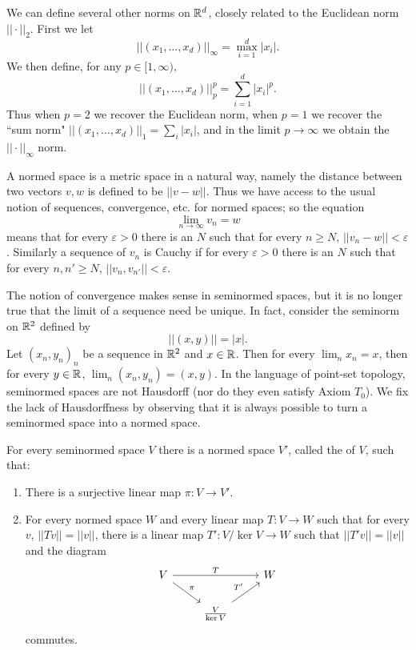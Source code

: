 \begin{example}
We can define several other norms on $\mathbb{R}^d$, closely related to the Euclidean norm $||\cdot||_2$. First we let
$$||(x_1, \dots, x_d)||_\infty = \max_{i=1}^d |x_i|.$$
We then define, for any $p \in [1, \infty),$
$$||(x_1, \dots, x_d)||_p^p = \sum_{i=1}^d |x_i|^p.$$
Thus when $p = 2$ we recover the Euclidean norm, when $p = 1$ we recover the ``sum norm" $||(x_1, \dots, x_d)||_1 = \sum_i |x_i|$, and in the limit $p \to \infty$ we obtain the $||\cdot||_\infty$ norm.
\end{example}

\begin{subsec}
A normed space is a metric space in a natural way, namely the distance between two vectors $v,w$ is defined to be $||v - w||$.
Thus we have access to the usual notion of sequences, convergence, etc. for normed spaces; so the equation
$$\lim_{n \to \infty} v_n = w$$
means that for every $\varepsilon > 0$ there is an $N$ such that for every $n \geq N$, $||v_n - w|| < \varepsilon$.
Similarly a sequence of $v_n$ is Cauchy if for every $\varepsilon > 0$ there is an $N$ such that for every $n, n' \geq N$, $||v_n, v_{n'}|| < \varepsilon$.
\end{subsec}

\begin{subsec}
The notion of convergence makes sense in seminormed spaces, but it is no longer true that the limit of a sequence need be unique.
In fact, consider the seminorm on $\mathbb{R}^2$ defined by
$$||(x, y)|| = |x|.$$
Let $(x_n, y_n)_n$ be a sequence in $\mathbb{R}^2$ and $x \in \mathbb{R}$. Then for every $\lim_n x_n = x$, then for every $y \in \mathbb{R}$, $\lim_n (x_n, y_n) = (x, y)$.
In the language of point-set topology, seminormed spaces are not Hausdorff (nor do they even satisfy Axiom $T_0$).
We fix the lack of Hausdorffness by observing that it is always possible to turn a seminormed space into a normed space.
\end{subsec}

\begin{theorem}
\label{existence of normalization}
For every seminormed space $V$ there is a normed space $V'$, called the  of $V$, such that:
\begin{enumerate}
\item There is a surjective linear map $\pi: V \to V'$.
\item For every normed space $W$ and every linear map $T: V \to W$ such that for every $v$, $||Tv|| = ||v||$, there is a linear map $T': V/\ker V \to W$ such that $||T'v|| = ||v||$ and the diagram
\begin{equation}
\label{normification universal}
\begin{tikzcd}
V \arrow[rr,"T"] \arrow[dr,"\pi"] && W\\
& \frac{V}{\ker V} \arrow[ur,"T'"]
\end{tikzcd}
\end{equation}
commutes.
\end{enumerate}
\end{theorem}

